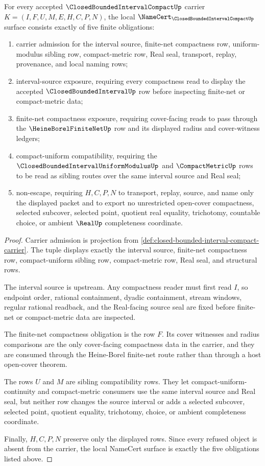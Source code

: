 \begin{theorem}
\label{thm:closed-bounded-interval-compact-namecert-obligations}
For every accepted $\ClosedBoundedIntervalCompactUp$ carrier $K=(I,F,U,M,E,H,C,P,N)$, the local $\NameCert_{\ClosedBoundedIntervalCompactUp}$ surface consists exactly of five finite obligations:
\begin{enumerate}
\item carrier admission for the interval source, finite-net compactness row, uniform-modulus sibling row, compact-metric row, Real seal, transport, replay, provenance, and local naming rows;
\item interval-source exposure, requiring every compactness read to display the accepted $\ClosedBoundedIntervalUp$ row before inspecting finite-net or compact-metric data;
\item finite-net compactness exposure, requiring cover-facing reads to pass through the $\HeineBorelFiniteNetUp$ row and its displayed radius and cover-witness ledgers;
\item compact-uniform compatibility, requiring the $\ClosedBoundedIntervalUniformModulusUp$ and $\CompactMetricUp$ rows to be read as sibling routes over the same interval source and Real seal;
\item non-escape, requiring $H,C,P,N$ to transport, replay, source, and name only the displayed packet and to export no unrestricted open-cover compactness, selected subcover, selected point, quotient real equality, trichotomy, countable choice, or ambient $\RealUp$ completeness coordinate.
\end{enumerate}
\end{theorem}
\begin{proof}
Carrier admission is projection from \autoref{def:closed-bounded-interval-compact-carrier}. The tuple displays exactly the interval source, finite-net compactness row, compact-uniform sibling row, compact-metric row, Real seal, and structural rows.

The interval source is upstream. Any compactness reader must first read $I$, so endpoint order, rational containment, dyadic containment, stream windows, regular rational readback, and the Real-facing source seal are fixed before finite-net or compact-metric data are inspected.

The finite-net compactness obligation is the row $F$. Its cover witnesses and radius comparisons are the only cover-facing compactness data in the carrier, and they are consumed through the Heine-Borel finite-net route rather than through a host open-cover theorem.

The rows $U$ and $M$ are sibling compatibility rows. They let compact-uniform-continuity and compact-metric consumers use the same interval source and Real seal, but neither row changes the source interval or adds a selected subcover, selected point, quotient equality, trichotomy, choice, or ambient completeness coordinate.

Finally, $H,C,P,N$ preserve only the displayed rows. Since every refused object is absent from the carrier, the local NameCert surface is exactly the five obligations listed above.
\end{proof}

